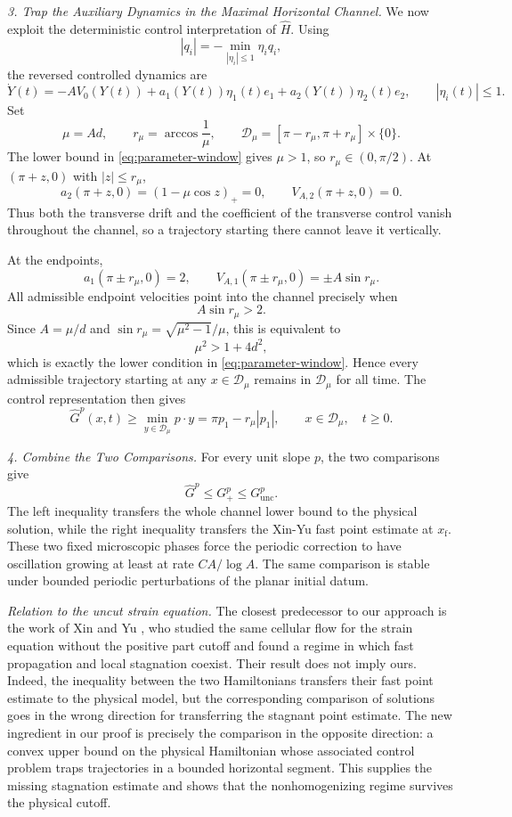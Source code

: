 \documentclass[11pt,reqno,noamsfonts]{amsart}
\theoremstyle{definition}
\theoremstyle{remark}
\begin{document}
\textit{3. Trap the Auxiliary Dynamics in the Maximal Horizontal Channel.}
We now exploit the deterministic control interpretation of
$\widehat H$.  Using
\[
  |q_i|=-\min_{|\eta_i|\le1}\eta_iq_i,
\]
the reversed controlled dynamics are
\[
  \dot Y(t)
  =-A V_0(Y(t))
  +a_1(Y(t))\eta_1(t)e_1
  +a_2(Y(t))\eta_2(t)e_2,
  \qquad |\eta_i(t)|\le1.
\]
Set
\[
  \mu=Ad,
  \qquad
  r_\mu=\arccos\frac1\mu,
  \qquad
  \mathcal D_\mu=[\pi-r_\mu,\pi+r_\mu]\times\{0\}.
\]
The lower bound in \eqref{eq:parameter-window} gives $\mu>1$, so
$r_\mu\in(0,\pi/2)$.  At $(\pi+z,0)$ with $|z|\le r_\mu$,
\[
  a_2(\pi+z,0)=(1-\mu\cos z)_+=0,
  \qquad
  V_{A,2}(\pi+z,0)=0.
\]
Thus both the transverse drift and the coefficient of the transverse
control vanish throughout the channel, so a trajectory starting there
cannot leave it vertically.

At the endpoints,
\[
  a_1(\pi\pm r_\mu,0)=2,
  \qquad
  V_{A,1}(\pi\pm r_\mu,0)=\pm A\sin r_\mu.
\]
All admissible endpoint velocities point into the channel precisely when
\[
  A\sin r_\mu>2.
\]
Since $A=\mu/d$ and
$\sin r_\mu=\sqrt{\mu^2-1}/\mu$, this is equivalent to
\[
  \mu^2>1+4d^2,
\]
which is exactly the lower condition in
\eqref{eq:parameter-window}.  Hence every admissible trajectory starting
at any $x\in\mathcal D_\mu$ remains in $\mathcal D_\mu$ for all time.
The control representation then gives
\[
  \widehat G^p(x,t)
  \ge\min_{y\in\mathcal D_\mu}p\cdot y
  =\pi p_1-r_\mu|p_1|,
  \qquad x\in\mathcal D_\mu,\quad t\ge0.
\]

\textit{4. Combine the Two Comparisons.}
For every unit slope $p$, the two comparisons give
\[
  \widehat G^p\le G_+^p\le G_{\mathrm{unc}}^p.
\]
The left inequality transfers the whole channel lower bound to the
physical solution, while the right inequality transfers the Xin-Yu
fast point estimate at $x_{\mathrm f}$.  These two fixed microscopic
phases force the periodic correction to have oscillation growing at
least at rate $CA/\log A$.  The same comparison is stable under bounded
periodic perturbations of the planar initial datum.

\textit{Relation to the uncut strain equation.}
The closest predecessor to our approach is the work of Xin and Yu
\cite{XinYu2014}, who studied the same cellular flow for the strain
equation without the positive part cutoff and found a regime in which
fast propagation and local stagnation coexist. Their result does not
imply ours.  Indeed, the inequality between the two Hamiltonians
transfers their fast point estimate to the physical model, but the
corresponding comparison of solutions goes in the wrong direction for
transferring the stagnant point estimate.  The new ingredient in our proof is precisely the comparison in the
opposite direction: a convex upper bound on the physical Hamiltonian
whose associated control problem traps trajectories in a bounded
horizontal segment.  This supplies the missing stagnation estimate and
shows that the nonhomogenizing regime survives the physical cutoff.
\end{document}
